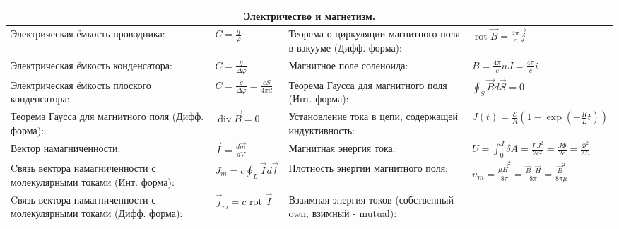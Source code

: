 \documentclass{article}
\begin{document}
\newpage

\begin{tabular}{ |p{6cm}|p{3.5cm}|p{6cm}|p{3.5cm}|  }
\hline
\multicolumn{4}{|c|}{Электричество и магнетизм.} \\
\hline
Электрическая ёмкость проводника:                                          &
$C= \frac{q}{\varphi}$                                                     &
Теорема о циркуляции магнитного поля в вакууме (Дифф. форма):              &
$\operatorname{rot} \vec{B}=\frac{4 \pi}{c} \vec{j}$                       \\
\hline
Электрическая ёмкость конденсатора:                                        &
$C=\frac {q}{\Delta \varphi}$                                              &
Магнитное поле соленоида:                                                  &
$B = \frac{4 \pi}{c} n J=\frac{4 \pi}{c} i$                                \\
\hline
Электрическая ёмкость плоского конденсатора:                               &
$C=\frac{q}{\Delta \varphi}=\frac{\varepsilon S}{4 \pi d}$                 &
Теорема Гаусса для магнитного поля (Инт. форма):                           &
$\oint_{S} \vec{B} d \vec{S}=0$                                            \\
\hline
Теорема Гаусса для магнитного поля (Дифф. форма):                          &
$\operatorname{div} \vec{B}=0$                                             &
Установление тока в цепи, содержащей индуктивность:                        &
$J(t)=\frac{\mathcal{E}}{R}\left(1-\exp \left(-\frac{R}{L} t\right)\right)$ \\
\hline
Вектор намагниченности:                                                    &
$\vec{I}=\frac{d \vec{m}}{d V}$                                            &
Магнитная энергия тока:                                                    &
$U=\int_{0}^{J} \delta A=\frac{L J^{2}}{2 c^{2}}=\frac{J \Phi}{2 c}=\frac{\Phi^{2}}{2 L}$\\
\hline
Cвязь вектора намагниченности с молекулярными токами (Инт. форма):         &
$J_{m}=c \oint_{L} \vec{I} d {\vec l}$                                     &
Плотность энергии магнитного поля:                                         &
$u_{m}=\frac{\mu \vec{H}^{2}}{8 \pi}=\frac{\vec{B} \cdot \vec{H}}{8 \pi}=\frac{\vec{B}^{2}}{8 \pi \mu}$ \\
\hline
Cвязь вектора намагниченности с молекулярными токами (Дифф. форма):        &
$\vec{j}_{m}=c$ rot $\vec{I}$                                              &
Взаимная энергия токов (собственный - own, взимный - mutual):              &

\end{tabular}
\end{document}
